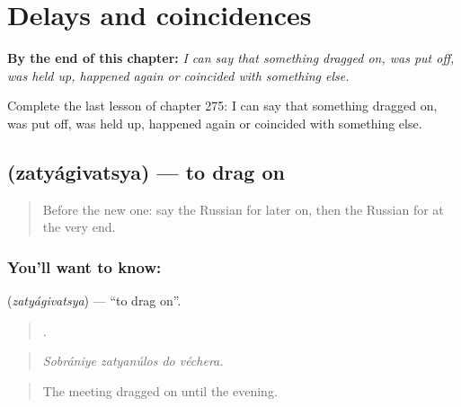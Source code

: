 
\chapter{Delays and coincidences}
\label{ch:ru-delays-and-coincidences}

\begin{chapteropening}
\textbf{By the end of this chapter:} \emph{I can say that something dragged on, was put off, was held up, happened again or coincided with something else.}

Complete the last lesson of chapter 275: I can say that something dragged on, was put off, was held up, happened again or coincided with something else.
\end{chapteropening}

\section[\texorpdfstring{\ru{затягиваться} (zatyágivatsya)}{затягиваться (zatyágivatsya)}]{ (zatyágivatsya) — to drag on}

\label{lesson:RU-C275-zatyagivatsya}



\begin{quote}
Before the new one: say the Russian for later on, then the Russian for at the very end.
\end{quote}

\subsection*{You'll want to know: }
\textbf{} (\emph{zatyágivatsya}) — \textquotedblleft{}to drag on\textquotedblright{}.

\begin{quote}
   .
\end{quote}

\begin{quote}
\emph{Sobrániye zatyanúlos do véchera.}
\end{quote}

\begin{quote}
The meeting dragged on until the evening.
\end{quote}

